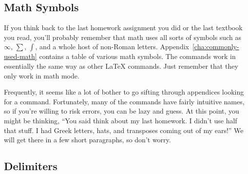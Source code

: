 \subsection{Math Symbols}
\label{sec:math-symbols}

If you think back to the last homework assignment you did or the last
textbook you read, you'll probably remember that math uses all sorts
of symbols such as $\infty$, $\sum$, $\int$, and a whole host of
non-Roman letters.  Appendix~\ref{cha:commonly-used-math} contains a
table of various math symbols.  The commands work in essentially the
same way as other \LaTeX{} commands.  Just remember that they only
work in math mode.

Frequently, it seems like a lot of bother to go sifting through
appendices looking for a command.  Fortunately, many of the commands
have fairly intuitive names, so if you're willing to risk errors, you
can be lazy and guess.  At this point, you might be thinking, ``You
said think about my last homework.  I didn't use half that stuff.  I
had Greek letters, hats, and transposes coming out of my ears!''  We
will get there in a few short paragraphs, so don't worry.

\subsection{Delimiters}
\label{sec:delimiters}

